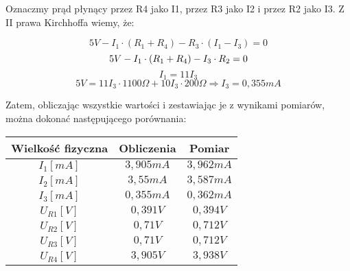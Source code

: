 \documentclass[polish,a4paper]{article}
\begin{document}
\begin{figure}[!h]
\centering
{}
\end{figure}
\begin{flushleft}
Oznaczmy prąd płynący przez R4 jako I1, przez R3 jako I2 i przez R2 jako I3.
Z II prawa Kirchhoffa wiemy, że:
\end{flushleft}

$$
5V - I_{1}\cdot(R_{1}+R_{4}) - R_{3}\cdot(I_{1} - I_{3}) = 0
$$
$$
5V - I_{1}\cdot(R_{1}+R_{4}) - I_{3}\cdot R_{2} = 0\\
$$
$$
I_{1}=11I_{3}
$$
$$
5V=11I_{3}\cdot1100\Omega + 10I_{3}\cdot200\Omega \Rightarrow I_{3}=0,355mA
$$

\begin{flushleft}
Zatem, obliczając wszystkie wartości i zestawiając je z wynikami pomiarów, można dokonać następującego porównania:
\end{flushleft}

\begin{center}
\begin{tabular}{|c|c|c|}
\hline
\textbf{Wielkość fizyczna} & \textbf{Obliczenia} & \textbf{Pomiar}\\
\hline
$I_{1}[mA]$ & $3,905mA$ & $3,962mA$\\
\hline
$I_{2}[mA]$ & $3,55mA$ & $3,587mA$\\
\hline
$I_{3}[mA]$ & $0,355mA$ & $0,362mA$\\
\hline
$U_{R1}[V]$ & $0,391V$ & $0,394V$\\
\hline
$U_{R2}[V]$ & $0,71V$ & $0,712V$\\
\hline
$U_{R3}[V]$ & $0,71V$ & $0,712V$\\
\hline
$U_{R4}[V]$ & $3,905V$ & $3,938V$\\
\hline
\end{tabular}
\end{center}
\end{document}
